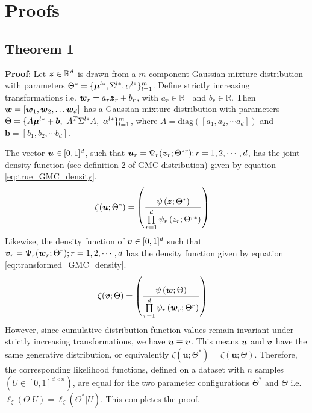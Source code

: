 \documentclass{article}
\theoremstyle{plain}
\theoremstyle{definition}
\theoremstyle{remark}
\begin{document}
\section{Proofs}\label{apd:Proofs}
\subsection{Theorem 1}\label{apd:Proof_theorem_1}
\textbf{Proof}:  Let $\boldsymbol{z}\in \mathbb{R}^d$ is drawn from a $m$-component Gaussian mixture distribution with parameters $\Theta^* = \{\boldsymbol{\mu}^{l*}, \Sigma^{l*}, \alpha^{l*}\}_{l=1}^m$. Define strictly increasing transformations i.e. $\boldsymbol{w}_r = a_r \boldsymbol{z}_r+b_r$, with $a_r \in \mathbb{R}^+$ and $b_r \in \mathbb{R}$. Then $\boldsymbol{w}= [\boldsymbol{w}_1, \boldsymbol{w}_2,\ldots \boldsymbol{w}_d]$  has a Gaussian mixture distribution with parameters  $\Theta= \{A\bs{\mu}^{l*}+\bs{b}, \ A^T\Sigma^{l*}A, \ \alpha^{l*}\}_{l=1}^m$, where $A = \text{diag}([a_1, a_2, \cdots a_d])$ and $\textbf{b}=[b_1, b_2, \cdots b_d]$.

The vector $\boldsymbol{u}\in [0,1]^d$, such that $\boldsymbol{u}_r = \Psi_r(\boldsymbol{z}_r;\Theta^{*r}); r=1,2,\cdots, d $, has the joint density function (see definition 2 of GMC distribution) given by equation \eqref{eq:true_GMC_density}.
\begin{align}\label{eq:true_GMC_density}
\zeta(\boldsymbol{u};\Theta^*) & = \left( \frac{\psi\left(\boldsymbol{z};\Theta^*\right)}{\prod\limits_{r=1}^{d}\psi_r\left(z_r;\Theta^{r*} \right)} \right)
\end{align}
Likewise, the density function of $\boldsymbol{v}\in [0,1]^d$ such that $\boldsymbol{v}_r = \Psi_r(\boldsymbol{w}_r;\Theta^r); r=1,2,\cdots, d $ has the density function given by equation \eqref{eq:transformed_GMC_density}.
\begin{align}\label{eq:transformed_GMC_density}
\zeta(\boldsymbol{v};\Theta) & = \left( \frac{\psi\left(\boldsymbol{w};\Theta\right)}{\prod\limits_{r=1}^{d}\psi_r\left(\boldsymbol{w}_r;\Theta^r \right)} \right)
\end{align}
However, since cumulative distribution function values remain invariant under strictly increasing transformations, we have $\boldsymbol{u} \equiv \boldsymbol{v}$. This means $\boldsymbol{u}$ and $\boldsymbol{v}$ have the same generative distribution, or equivalently $\zeta(\textbf{u};\Theta^*) = \zeta(\textbf{u};\Theta)$. Therefore, the corresponding likelihood functions, defined on a dataset with $n$ samples $(U \in [0 , 1]^{d\times n})$, are equal for the two parameter configurations $\Theta^*$ and $\Theta$ i.e. $\ell_\zeta(\Theta|U) = \ell_\zeta(\Theta^*|U)$. This completes the proof.
\end{document}
